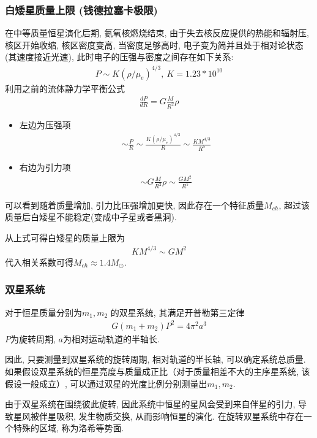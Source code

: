 \subsubsection{白矮星质量上限 (钱德拉塞卡极限)}
在中等质量恒星演化后期, 氦氧核燃烧结束, 由于失去核反应提供的热能和辐射压, 核区开始收缩, 核区密度变高, 当密度足够高时, 电子变为简并且处于相对论状态(其速度接近光速), 此时电子的压强与密度之间存在如下关系: 
\begin{align*}
    P\sim K(\rho/\mu_e)^{4/3},\ K=1.23*10^{10}
\end{align*}
利用之前的流体静力学平衡公式
\begin{align*}
    \frac{dP}{dR}=G\frac{M}{R^2}\rho
\end{align*}
\begin{itemize}
    \item 左边为压强项
    \begin{align*}
        \sim \frac{P}{R}\sim \frac{K(\rho/\mu_e)^{4/3}}{R} \sim \frac{KM^{4/3}}{R^5}
    \end{align*}
    \item 右边为引力项
    \begin{align*}
        \sim G\frac{M}{R^2}\rho \sim \frac{GM^2}{R^5}
    \end{align*}
\end{itemize}
可以看到随着质量增加, 引力比压强增加更快, 因此存在一个特征质量$M_{ch}$, 超过该质量后白矮星不能稳定(变成中子星或者黑洞). 

从上式可得白矮星的质量上限为
\begin{align*}
    KM^{4/3}\sim GM^2
\end{align*}
代入相关系数可得$M_{ch}\approx 1.4M_{\odot}$. 

\subsubsection{双星系统}
对于恒星质量分别为$m_1, m_2$ 的双星系统, 其满足开普勒第三定律
\begin{align*}
    G(m_1+m_2)P^2=4\pi^2 a^3
\end{align*}
$P$为旋转周期, $a$为相对运动轨道的半轴长. 

\small
因此, 只要测量到双星系统的旋转周期, 相对轨道的半长轴, 可以确定系统总质量. 如果假设双星系统的恒星亮度与质量成正比（对于质量相差不大的主序星系统, 该假设一般成立）, 可以通过双星的光度比例分别测量出$m_1, m_2$. 
\normalsize

由于双星系统在围绕彼此旋转, 因此系统中恒星的星风会受到来自伴星的引力, 导致星风被伴星吸积, 发生物质交换, 从而影响恒星的演化. 在旋转双星系统中存在一个特殊的区域, 称为洛希等势面. 

